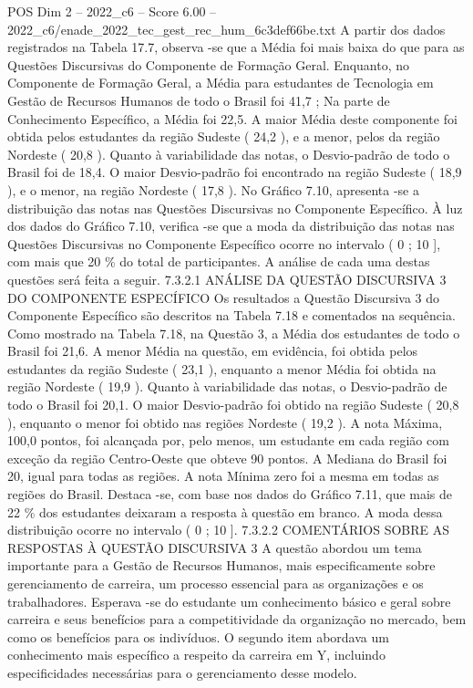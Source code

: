 \begin{textsample}{POS Dim 2 – 2022\_c6 – Score 6.00 – 2022\_c6/enade\_2022\_tec\_gest\_rec\_hum\_6c3def66be.txt}
A partir dos dados registrados na Tabela 17.7, observa -se que a Média foi mais baixa do que para as Questões Discursivas do Componente de Formação Geral.
Enquanto, no Componente de Formação Geral, a Média para estudantes de Tecnologia em Gestão de Recursos Humanos de todo o Brasil foi 41,7 ; Na parte de Conhecimento Específico, a Média foi 22,5.
A maior Média deste componente foi obtida pelos estudantes da região Sudeste ( 24,2 ), e a menor, pelos da região Nordeste ( 20,8 ).
Quanto à variabilidade das notas, o Desvio-padrão de todo o Brasil foi de 18,4.
O maior Desvio-padrão foi encontrado na região Sudeste ( 18,9 ), e o menor, na região Nordeste ( 17,8 ).
No Gráfico 7.10, apresenta -se a distribuição das notas nas Questões Discursivas no Componente Específico.
À luz dos dados do Gráfico 7.10, verifica -se que a moda da distribuição das notas nas Questões Discursivas no Componente Específico ocorre no intervalo ( 0 ; 10 ], com mais que 20 \% do total de participantes.
A análise de cada uma destas questões será feita a seguir. 7.3.2.1 ANÁLISE DA QUESTÃO DISCURSIVA 3 DO COMPONENTE ESPECÍFICO Os resultados a Questão Discursiva 3 do Componente Específico são descritos na Tabela 7.18 e comentados na sequência.
Como mostrado na Tabela 7.18, na Questão 3, a Média dos estudantes de todo o Brasil foi 21,6.
A menor Média na questão, em evidência, foi obtida pelos estudantes da região Sudeste ( 23,1 ), enquanto a menor Média foi obtida na região Nordeste ( 19,9 ).
Quanto à variabilidade das notas, o Desvio-padrão de todo o Brasil foi 20,1.
O maior Desvio-padrão foi obtido na região Sudeste ( 20,8 ), enquanto o menor foi obtido nas regiões Nordeste ( 19,2 ).
A nota Máxima, 100,0 pontos, foi alcançada por, pelo menos, um estudante em cada região com exceção da região Centro-Oeste que obteve 90 pontos.
A Mediana do Brasil foi 20, igual para todas as regiões.
A nota Mínima zero foi a mesma em todas as regiões do Brasil.
Destaca -se, com base nos dados do Gráfico 7.11, que mais de 22 \% dos estudantes deixaram a resposta à questão em branco.
A moda dessa distribuição ocorre no intervalo ( 0 ; 10 ]. 7.3.2.2 COMENTÁRIOS SOBRE AS RESPOSTAS À QUESTÃO DISCURSIVA 3 A questão abordou um tema importante para a Gestão de Recursos Humanos, mais especificamente sobre gerenciamento de carreira, um processo essencial para as organizações e os trabalhadores.
Esperava -se do estudante um conhecimento básico e geral sobre carreira e seus benefícios para a competitividade da organização no mercado, bem como os benefícios para os indivíduos.
O segundo item abordava um conhecimento mais específico a respeito da carreira em Y, incluindo especificidades necessárias para o gerenciamento desse modelo.

\end{textsample}
